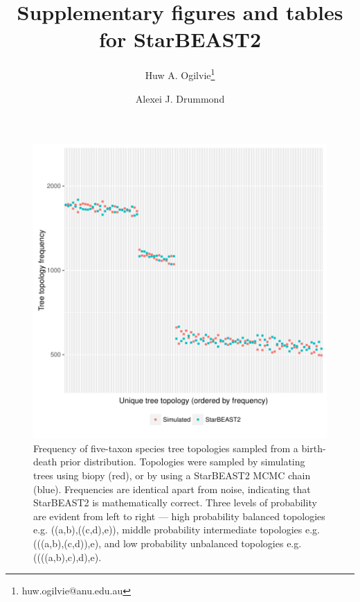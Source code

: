 \documentclass[12pt]{article}
\begin{document}
\title{Supplementary figures and tables for StarBEAST2}
\author[1,2]{Huw A. Ogilvie\thanks{huw.ogilvie@anu.edu.au}}
\author[2,3]{Alexei J. Drummond}

\maketitle

\clearpage

\justifying

\begin{figure}[htb!]
\centering
\includegraphics[width=16cm]{species_topology_frequencies.pdf}
\caption
{Frequency of five-taxon species tree topologies sampled from a birth-death prior
distribution. Topologies were sampled by simulating trees using biopy (red), or
by using a StarBEAST2 MCMC chain (blue). Frequencies are identical apart from
noise, indicating that StarBEAST2 is mathematically correct. Three levels of
probability are evident from left to right --- high probability balanced
topologies e.g. ((a,b),((c,d),e)), middle probability intermediate topologies
e.g. (((a,b),(c,d)),e), and low probability unbalanced topologies e.g.
((((a,b),c),d),e).}
\label{fig:speciesTopologyFrequencies}
\end{figure}
\end{document}
